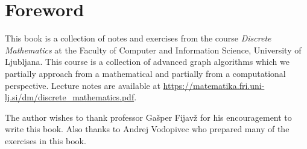 
\chapter*{Foreword}

This book is a collection of notes and exercises from the course \textit{Discrete Mathematics} at the Faculty of Computer and Information Science, University of Ljubljana. This course is a collection of advanced graph algorithms which we partially approach from a mathematical and partially from a computational perspective.
Lecture notes are available at \url{https://matematika.fri.uni-lj.si/dm/discrete_mathematics.pdf}.

The author wishes to thank professor Gašper Fijavž for his encouragement to write this book. Also thanks to Andrej Vodopivec who prepared many of the exercises in this book.